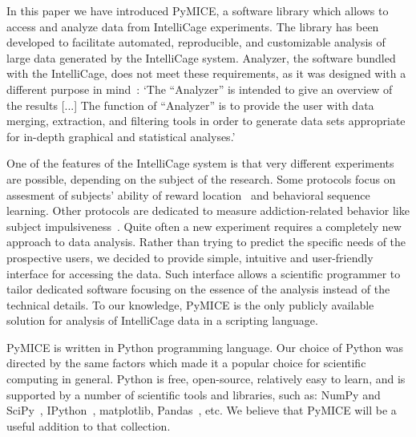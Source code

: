 In this paper we have introduced PyMICE, a software library which allows to access
and analyze data from IntelliCage experiments. 
The library has been developed to 
facilitate automated, reproducible, and customizable analysis of large data 
generated by the IntelliCage system. Analyzer, the software bundled with the 
IntelliCage, does not meet these requirements, as it was designed with a 
different purpose in mind~\cite{intelliCagePlusManual2011}:
`The ``Analyzer'' is intended to give an overview of the results [...]
The function of ``Analyzer'' is to provide the user with data merging,
extraction, and filtering tools in order to generate data sets appropriate for
in-depth graphical and statistical analyses.'

One of the features of the IntelliCage system is that very different
experiments are possible, depending on the subject of the research.
Some protocols focus on assesment of subjects' ability of reward
location~\cite{Knapska:2013dj} and behavioral sequence~\cite{Endo:2011bs}
learning. Other protocols are dedicated to measure addiction-related
behavior like subject impulsiveness~\cite{Radwanska:2012fd,Mijakowska:2015io}.
Quite often a new experiment requires a
completely new approach to data analysis. Rather than trying to predict the
specific needs of the prospective users, we decided to provide simple,
intuitive and user-friendly interface for accessing the data. Such interface
allows a scientific programmer to tailor dedicated software focusing on the
essence of the analysis instead of the technical details. To our knowledge,
PyMICE is the only publicly available solution for analysis of IntelliCage 
data in a scripting language.

PyMICE is written in Python programming language. Our choice of Python 
was directed by the same factors
which made it a popular choice for scientific computing in general. 
Python is free,
open-source, relatively easy to learn, and is supported by a number of
scientific tools and libraries, such as: NumPy and SciPy~\cite{Oliphant:2007ud},
IPython~\cite{Perez:2007wf}, matplotlib,
Pandas~\cite{mckinney-proc-scipy-2010}, etc.
We believe that PyMICE will be a useful addition to that collection.


